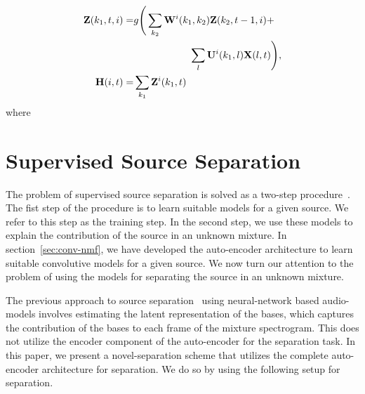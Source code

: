 \documentclass{article}
\begin{document}
\begin{align}
  \mathbf Z(k_1, t, i) =& g\Bigg( \sum_{k_2}\mathbf W^i(k_1,k_2 ) \mathbf Z(k_2, t-1, i) + \notag \\
  & \hspace{2cm} \sum_l \mathbf U^i(k_1,l) \mathbf X(l, t) \Bigg), \\
  \mathbf H(i, t) =& \sum_{k_1} \mathbf Z^i(k_1, t)
\end{align}
where  






\section{Supervised Source Separation}
\label{sec:ss}
The problem of supervised source separation is solved as a two-step procedure~\cite{smaragdis2007supervised}. The fist step of the procedure is to learn suitable models for a given source. We refer to this step as the training step. In the second step, we use these models to explain the contribution of the source in an unknown mixture. In section~\ref{sec:conv-nmf}, we have developed the auto-encoder architecture to learn suitable convolutive models for a given source. We now turn our attention to the problem of using the models for separating the source in an unknown mixture.

The previous approach to source separation~\cite{smaragdis2017aneural} using neural-network based audio-models involves estimating the latent representation of the bases, which captures the contribution of the bases to each frame of the mixture spectrogram. This does not utilize the encoder component of the auto-encoder for the separation task. In this paper, we present a novel-separation scheme that utilizes the complete auto-encoder architecture for separation. We do so by using the following setup for separation. 
\end{document}
